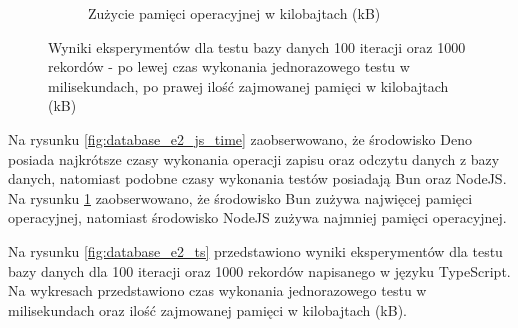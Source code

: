 \begin{figure}[H]
\begin{subfigure}[b]{0.44\textwidth}
    \caption{Zużycie pamięci operacyjnej w kilobajtach (kB)}
    \label{fig:database_e2_js_memory}
  \end{subfigure}
  \caption{Wyniki eksperymentów dla testu bazy danych 100 iteracji oraz 1000 rekordów - po lewej czas wykonania jednorazowego testu w milisekundach, po prawej ilość zajmowanej pamięci w kilobajtach (kB)}
  \label{fig:database_e2_js}
\end{figure}

Na rysunku \ref{fig:database_e2_js_time} zaobserwowano, że środowisko Deno posiada najkrótsze czasy wykonania operacji zapisu oraz odczytu danych z bazy danych, natomiast podobne czasy wykonania testów posiadają Bun oraz NodeJS. Na rysunku \ref{fig:database_e2_js_memory} zaobserwowano, że środowisko Bun zużywa najwięcej pamięci operacyjnej, natomiast środowisko NodeJS zużywa najmniej pamięci operacyjnej.

Na rysunku \ref{fig:database_e2_ts} przedstawiono wyniki eksperymentów dla testu bazy danych dla 100 iteracji oraz 1000 rekordów napisanego w języku TypeScript. Na wykresach przedstawiono czas wykonania jednorazowego testu w milisekundach oraz ilość zajmowanej pamięci w kilobajtach (kB).

